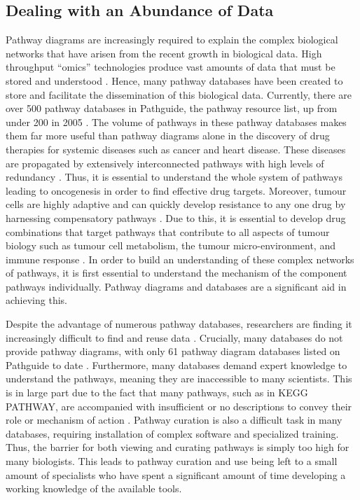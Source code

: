 \documentclass[a4paper,12pt,twoside]{apa}
\begin{document}
\subsection{Dealing with an Abundance of Data}
Pathway diagrams are increasingly required to explain the complex biological networks that have arisen from the recent growth in biological data. High throughput ``omics'' technologies produce vast amounts of data that must be stored and understood \cite{bohler2016reactome}. Hence, many pathway databases have been created to store and facilitate the dissemination of this biological data. Currently, there are over 500 pathway databases in Pathguide, the pathway resource list, up from under 200 in 2005 \cite{bader2006pathguide, cary2005pathway}. The volume of pathways in these pathway databases makes them far more useful than pathway diagrams alone in the discovery of drug therapies for systemic diseases such as cancer and heart disease. These diseases are propagated by extensively interconnected pathways with high levels of redundancy \cite{ryall2015systems}. Thus, it is essential to understand the whole system of pathways leading to oncogenesis in order to find effective drug targets. Moreover, tumour cells are highly adaptive and can quickly develop resistance to any one drug by harnessing compensatory pathways \cite{dry2016looking}. Due to this, it is essential to develop drug combinations that target pathways that contribute to all aspects of tumour biology such as tumour cell metabolism, the tumour micro-environment, and immune response \cite{ryall2015systems}. In order to build an understanding of these complex networks of pathways, it is first essential to understand the mechanism of the component pathways individually. Pathway diagrams and databases are a significant aid in achieving this.

Despite the advantage of numerous pathway databases, researchers are finding it increasingly difficult to find and reuse data \cite{dumontier2016health}. Crucially, many databases do not provide pathway diagrams, with only 61 pathway diagram databases listed on Pathguide to date \cite{bader2006pathguide}. Furthermore, many databases demand expert knowledge to understand the pathways, meaning they are inaccessible to many scientists. This is in large part due to the fact that many pathways, such as in KEGG PATHWAY, are accompanied with insufficient or no descriptions to convey their role or mechanism of action \cite{kanehisa2004kegg}. Pathway curation is also a difficult task in many databases, requiring installation of complex software and specialized training. Thus, the barrier for both viewing and curating pathways is simply too high for many biologists. This leads to pathway curation and use being left to a small amount of specialists who have spent a significant amount of time developing a working knowledge of the available tools.
\end{document}
